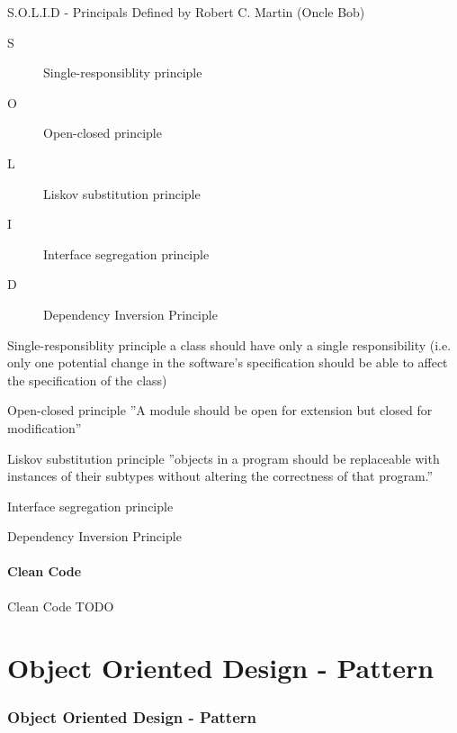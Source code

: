 \documentclass{beamer}
\begin{document}
\begin{frame}{S.O.L.I.D - Principals}
Defined by Robert C. Martin (Oncle Bob)


\begin{description}
\item [S] Single-responsiblity principle
\item [O] Open-closed principle
\item [L] Liskov substitution principle
\item [I] Interface segregation principle
\item [D] Dependency Inversion Principle
\end{description}
\end{frame}

\begin{frame}{Single-responsiblity principle}
a class should have only a single responsibility (i.e. only one potential change
in the software's specification should be able to affect the specification of the class)
\end{frame}

\begin{frame}{Open-closed principle}
''A module should be open for extension but closed for modification''
\end{frame}

\begin{frame}{Liskov substitution principle}
''objects in a program should be replaceable with instances of their subtypes
without altering the correctness of that program.''
\end{frame}

\begin{frame}{Interface segregation principle}
\end{frame}

\begin{frame}{Dependency Inversion Principle}
\end{frame}

\subsection{Clean Code}
\begin{frame}{Clean Code}
TODO
\end{frame}

\part{Object Oriented Design - Pattern}
\section{Object Oriented Design - Pattern}
\end{document}
